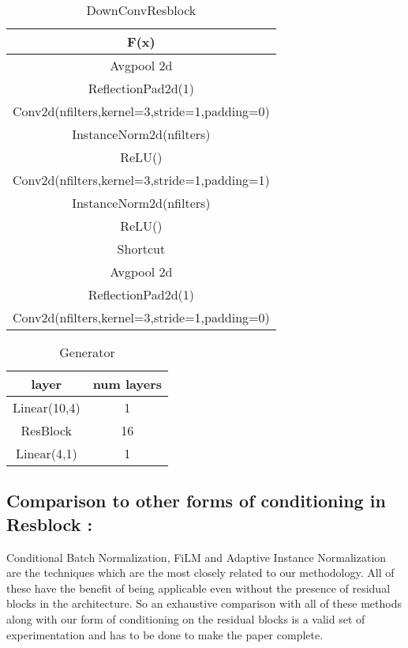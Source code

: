 \begin{table}[ht]
\caption{DownConvResblock} %
\centering %
\begin{tabular}{c} %
\hline\hline %
F(x)\\%
\hline
Avgpool 2d \\
ReflectionPad2d(1) \\
Conv2d(nfilters,kernel=3,stride=1,padding=0) \\
InstanceNorm2d(nfilters)\\ %
ReLU() \\
Conv2d(nfilters,kernel=3,stride=1,padding=1) \\
InstanceNorm2d(nfilters)\\ %
ReLU() \\
\hline %
Shortcut\\
\hline 
Avgpool 2d \\
ReflectionPad2d(1)\\
Conv2d(nfilters,kernel=3,stride=1,padding=0) \\
\hline
\end{tabular}
\label{table:downconvresblock} %
\end{table}


\begin{table}[ht]
\caption{Generator} %
\centering %
\begin{tabular}{c c} %
\hline\hline %
layer & num layers\\%
\hline %
Linear(10,4) & 1\\ %
ResBlock & 16 \\
Linear(4,1) & 1 \\
\hline %
\end{tabular}
\label{table:1d_G} %
\end{table}


\subsection{Comparison to other forms of conditioning in Resblock :}
Conditional Batch Normalization, FiLM and Adaptive Instance Normalization are the techniques which are the most closely related to our methodology. All of these have the benefit of being applicable even without the presence of residual blocks in the architecture. So an exhaustive comparison with all of these methods along with our form of conditioning on the residual blocks is a valid set of experimentation and has to be done to make the paper complete.


